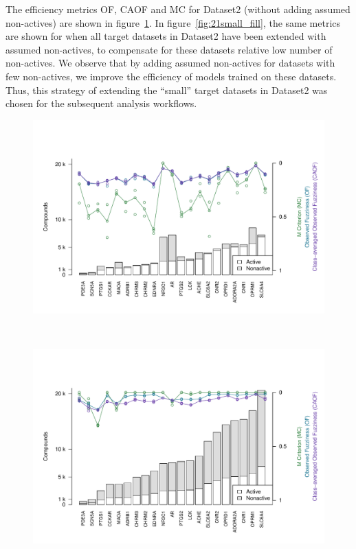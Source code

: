 \documentclass[utf8]{frontiersSCNS} %
\begin{document}
The efficiency metrics OF, CAOF and MC for Dataset2 (without adding assumed
non-actives) are shown in figure~\ref{fig:21small_orig}. In
figure~\ref{fig:21small_fill}, the same metrics are shown for when all target
datasets in Dataset2 have been extended with assumed non-actives, to compensate
for these datasets relative low number of non-actives.
We observe that by adding assumed non-actives for datasets with few
non-actives, we improve the efficiency of models trained on these datasets.
Thus, this strategy of extending the ``small'' target datasets in Dataset2
was chosen for the subsequent analysis workflows.

\begin{figure}[h!]
    \begin{minipage}[t]{0.62\textwidth}
        \setcounter{subfigure}{0} %
        \includegraphics[width=\textwidth]{figures/fig3a_21small_orig.pdf}
        \label{fig:21small_orig}
    \end{minipage} \\
    \begin{minipage}[t]{0.62\textwidth}
        \includegraphics[width=\textwidth]{figures/fig3b_21small_fill.pdf}

\end{minipage}
\end{figure}
\end{document}
